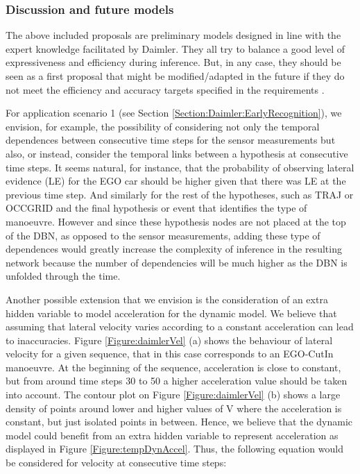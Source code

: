 \subsubsection{Discussion and future models}
The above included proposals are preliminary models designed in line with the expert knowledge facilitated by Daimler. They all try to balance a good level of expressiveness and efficiency during inference.  But, in any case, they should be seen as a first proposal that might be modified/adapted in the future if they do not meet the efficiency and accuracy targets specified in the requirements \cite{Fer14}. 

For application scenario 1 (see Section \ref{Section:Daimler:EarlyRecognition}),  we envision, for example, the possibility of considering not only the temporal dependences between consecutive time steps for the sensor measurements but also, or instead, consider the temporal links between a hypothesis at consecutive time steps. It seems natural, for instance, that the probability of observing lateral evidence (LE) for the EGO car should be higher given that there was LE at the previous time step. And similarly for the rest of the hypotheses, such as TRAJ or OCCGRID  and the final hypothesis or event that identifies the type of manoeuvre. However and since these hypothesis nodes are not placed at the top of the DBN, as opposed to the sensor measurements, adding these type of dependences would greatly increase the complexity of inference in the resulting network because the number of dependencies will be much higher as the DBN is unfolded through the time. 

Another possible extension that we envision is the consideration of an extra hidden variable to model acceleration for the dynamic model. We believe that assuming that lateral velocity varies according to a constant acceleration can lead to inaccuracies. Figure \ref{Figure:daimlerVel} (a) shows the behaviour of lateral velocity for a given sequence, that in this case corresponds to an EGO-CutIn manoeuvre. At the beginning of the sequence, acceleration is close to constant, but from around time steps 30 to 50 a higher acceleration value should be taken into account. The contour plot on Figure \ref{Figure:daimlerVel} (b) shows a large density of points around lower and higher values of V where the acceleration is constant, but just isolated points in between. Hence, we believe that the dynamic model could benefit from an extra hidden variable to represent acceleration as displayed in Figure \ref{Figure:tempDynAccel}. %
Thus, the following equation would be considered for velocity at consecutive time steps:

